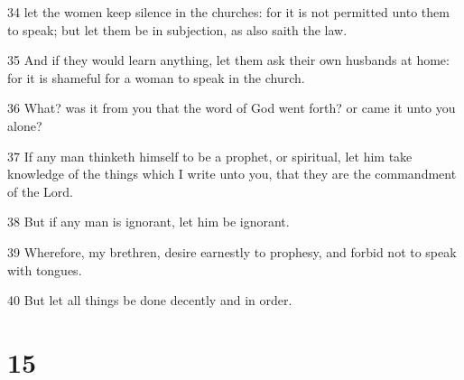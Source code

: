 \par 34 let the women keep silence in the churches: for it is not permitted unto them to speak; but let them be in subjection, as also saith the law.
\par 35 And if they would learn anything, let them ask their own husbands at home: for it is shameful for a woman to speak in the church.
\par 36 What? was it from you that the word of God went forth? or came it unto you alone?
\par 37 If any man thinketh himself to be a prophet, or spiritual, let him take knowledge of the things which I write unto you, that they are the commandment of the Lord.
\par 38 But if any man is ignorant, let him be ignorant.
\par 39 Wherefore, my brethren, desire earnestly to prophesy, and forbid not to speak with tongues.
\par 40 But let all things be done decently and in order.

\chapter{15}

